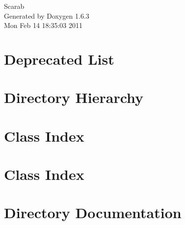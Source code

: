 \documentclass[a4paper]{book}
\begin{document}
\hypersetup{pageanchor=false}
\begin{titlepage}
\vspace*{7cm}
\begin{center}
{\Large Scarab }\\
\vspace*{1cm}
{\large Generated by Doxygen 1.6.3}\\
\vspace*{0.5cm}
{\small Mon Feb 14 18:35:03 2011}\\
\end{center}
\end{titlepage}
\clearemptydoublepage
{}
\tableofcontents
\clearemptydoublepage
{}
\hypersetup{pageanchor=true}
\chapter{Deprecated List}
\label{deprecated}
\hypertarget{deprecated}{}

\chapter{Directory Hierarchy}

\chapter{Class Index}

\chapter{Class Index}

\chapter{Directory Documentation}










\end{document}
